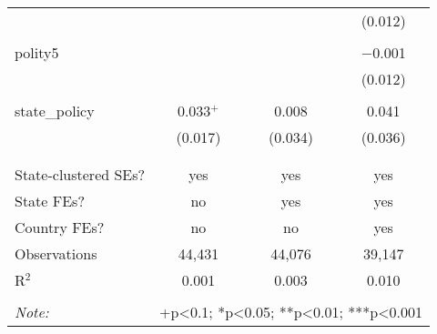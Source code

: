 \documentclass[11pt,]{article}
\begin{document}
\begin{table}[!htbp]
\begin{tabular}{@{\extracolsep{5pt}}lccc}
  &  &  & (0.012) \\ 
  & & & \\ 
 polity5 &  &  & $-$0.001 \\ 
  &  &  & (0.012) \\ 
  & & & \\ 
 state\_policy & 0.033$^{+}$ & 0.008 & 0.041 \\ 
  & (0.017) & (0.034) & (0.036) \\ 
  & & & \\ 
\hline \\[-1.8ex] 
State-clustered SEs? & yes & yes & yes \\ 
State FEs? & no & yes & yes \\ 
Country FEs? & no & no & yes \\ 
Observations & 44,431 & 44,076 & 39,147 \\ 
R$^{2}$ & 0.001 & 0.003 & 0.010 \\ 
\hline 
\hline \\[-1.8ex] 
\textit{Note:}  & \multicolumn{3}{r}{+p<0.1; *p<0.05; **p<0.01; ***p<0.001} \\ 
\end{tabular} 
\end{table}
\end{document}
